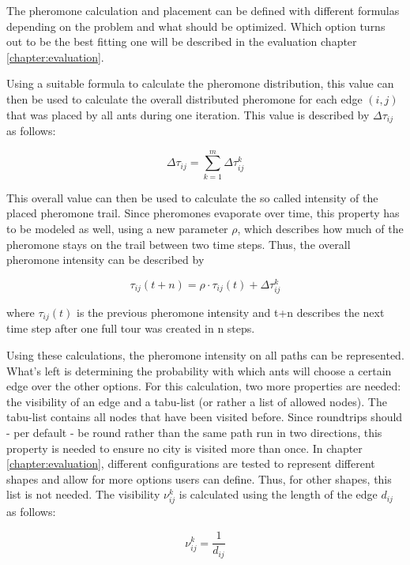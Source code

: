 The pheromone calculation and placement can be defined with different formulas depending on the problem and what should be optimized. 
Which option turns out to be the best fitting one will be described in the evaluation chapter \ref{chapter:evaluation}.


Using a suitable formula to calculate the pheromone distribution, this value can then be used to calculate the overall distributed pheromone for each edge $(i,j)$ that was placed by all ants during one iteration.
This value is described by $\Delta\tau_{ij}$ as follows\cite{dorigo_ant_1996}:

\begin{equation}\label{eq:deltaTau}
	\Delta\tau_{ij} = \sum_{k=1}^{m} \Delta\tau_{ij}^k 
\end{equation}

This overall value can then be used to calculate the so called \glqq intensity\grqq{} of the placed pheromone trail.
Since pheromones evaporate over time, this property has to be modeled as well, using a new parameter $\rho$, which describes how much of the pheromone stays on the trail between two time steps.
Thus, the overall pheromone intensity can be described by


\begin{equation}\label{eq:trailIntensity}
	\tau_{ij}(t+n) = \rho \cdot \tau_{ij}(t)+\Delta\tau_{ij}^k 
\end{equation}

where $\tau_{ij}(t)$ is the previous pheromone intensity and t+n describes the next time step after one full tour was created in n steps\cite{dorigo_ant_1996}.

Using these calculations, the pheromone intensity on all paths can be represented. 
What's left is determining the probability with which ants will choose a certain edge over the other options.
For this calculation, two more properties are needed: the visibility of an edge and a tabu-list (or rather a list of allowed nodes).
The tabu-list contains all nodes that have been visited before.
Since roundtrips should - per default - be round rather than the same path run in two directions, this property is needed to ensure no city is visited more than once.
In chapter \ref{chapter:evaluation}, different configurations are tested to represent different shapes and allow for more options users can define. 
Thus, for other shapes, this list is not needed.
The visibility $\nu_{ij}^k$ is calculated using the length of the edge $d_{ij}$ as follows:

\begin{equation}\label{eq:visibility}
	\nu_{ij}^k = \frac{1}{d_{ij}}
\end{equation}

